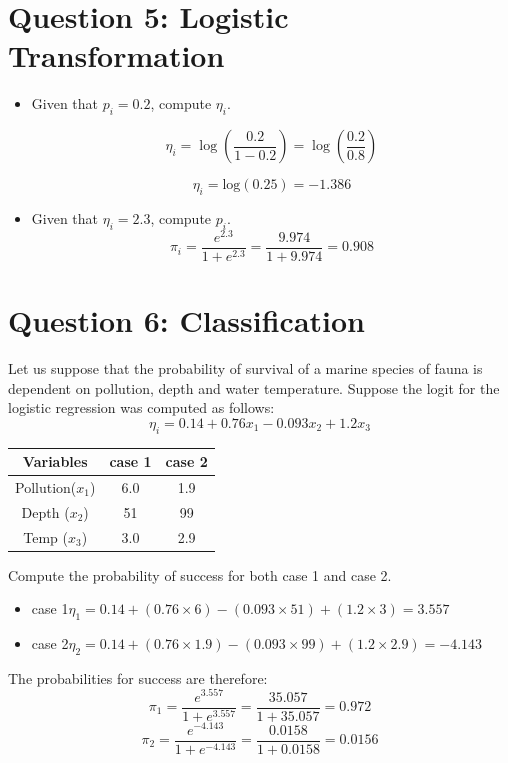 \documentclass[a4paper,12pt]{article}
\begin{document}
\section*{Question 5: Logistic Transformation}
\begin{itemize}
	\item 
	Given that $p_i = 0.2$, compute $\eta_i$.
	
	\[ \eta_i = \log \left( \frac{0.2}{1-0.2} \right)= \log\left( \frac{0.2}{0.8} \right)\] 
	
	\[ \eta_i =  \mbox{log}(0.25) =-1.386 \]
	
\item Given that $\eta_i = 2.3$, compute $p_i$.
	\[ \pi_i  =  \frac{e^{2.3}}{1 + e^{2.3}} = \frac{9.974}{1 + 9.974} = 0.908 \]
\end{itemize}
\section*{Question 6: Classification}
	Let us suppose that the probability of survival of a marine species of fauna is dependent on pollution, depth and water temperature. Suppose the logit for the logistic regression was computed as follows:
	\[ \eta_i = 0.14 + 0.76x_1 - 0.093x_2 + 1.2x_3  \]
	\begin{center}
		\begin{tabular}{|c|c|c|}
			\hline
			Variables & case 1 & case 2 \\ \hline
			Pollution($x_1$) & 6.0 & 1.9 \\
			Depth ($x_2$)& 51 & 99 \\
			Temp ($x_3$) & 3.0 & 2.9 \\
			\hline
		\end{tabular}
	\end{center}
	Compute the probability of success for both case 1 and case 2.
	
	\begin{itemize}
		\item case 1$ \eta_1 = 0.14 + (0.76 \times 6)	- (0.093\times 51) + (1.2\times 3) = 3.557$
		\item case 2$ \eta_2 = 0.14 + (0.76 \times 1.9)	- (0.093\times 99) + (1.2\times 2.9) = -4.143$
	\end{itemize}
	
	The probabilities for success are therefore:
	\[ \pi_1  =  \frac{e^{3.557}}{1 + e^{3.557}} = \frac{35.057}{1 + 35.057} = 0.972 \]
	\[ \pi_2  =  \frac{e^{-4.143}}{1 + e^{-4.143}} = \frac{0.0158}{1 + 0.0158} = 0.0156 \]
	
\end{document}
